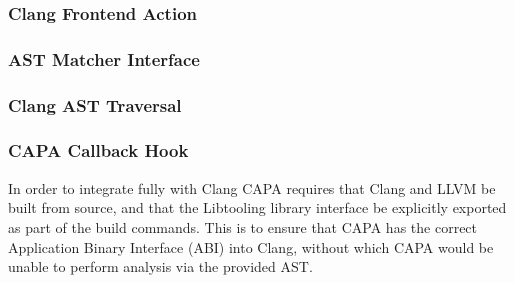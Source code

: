 \subsubsection{Clang Frontend Action}
\subsubsection{AST Matcher Interface}
\subsubsection{Clang AST Traversal}
\subsubsection{CAPA Callback Hook}

In order to integrate fully with Clang CAPA requires that Clang and LLVM be built from source, and
that the Libtooling library interface be explicitly exported as part of the build commands. This is
to ensure that CAPA has the correct Application Binary Interface (ABI) into Clang, without which
CAPA would be unable to perform analysis via the provided AST.





